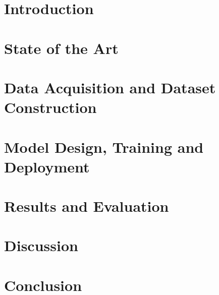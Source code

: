 \documentclass[a4paper, 12pt, oneside, BCOR1cm,toc=chapterentrywithdots]{scrbook}
\begin{document}
\onecolumn

\chapter{Introduction}
\label{ch:intro}

\chapter{State of the Art}

\chapter{Data Acquisition and Dataset Construction}

\chapter{Model Design, Training and Deployment}

\chapter{Results and Evaluation}
\label{ch:results}

\chapter{Discussion}
\label{ch:discussion}

\chapter{Conclusion}
\label{ch:conclusion}





\printindex
\end{document}
